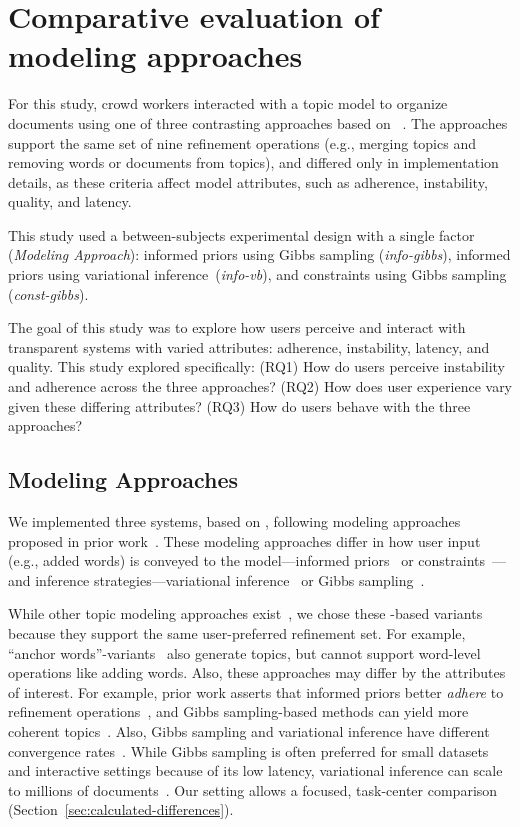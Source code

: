 \section{Comparative evaluation of \hltm{} modeling approaches}

For this study, crowd workers interacted with a topic model to organize documents using one of three contrasting
\hltm{} approaches based on \lda~\cite{blei-03}. The approaches support the same set of nine refinement operations (e.g., merging topics and removing words or documents from topics), and differed only in implementation details, as these criteria affect model attributes, such as adherence, instability, quality, and latency.

This study used a between-subjects experimental design with a single factor (\textit{Modeling Approach}): informed priors using Gibbs sampling
(\textit{info-gibbs}), informed priors using variational inference~(\textit{info-vb}), and constraints using Gibbs sampling
(\textit{const-gibbs}). 

The goal of this study was to explore how users perceive and interact with transparent systems with varied attributes: adherence, instability, latency, and quality. This study explored specifically: 
(RQ1) How do users perceive instability and adherence across the three \hltm{} approaches? 
(RQ2) How does user experience vary given these differing attributes? 
(RQ3) How do users behave with the three \hltm{} approaches?

\subsection{Modeling Approaches}

We implemented three \hltm{} systems, based on \lda{}, following modeling approaches
proposed in prior work~\citep{kumar-19}. These modeling
approaches differ in how user input (e.g., added words) is conveyed to the model---informed priors~\cite{Smith2018ClosingSystem} or constraints~\cite{yang-15}---and inference strategies---variational inference~\cite{blei-03} or Gibbs sampling~\cite{griffiths-04}.

While other topic modeling approaches exist~\cite{Larochelle2012AModel,Hofmann1999ProbabilisticIndexing}, we chose these  \lda-based variants because they support the same user-preferred refinement set. For example, ``anchor words''-variants~\cite{Lund2017TandemModeling} also generate topics, but cannot support word-level operations like adding words. Also, these approaches may differ by the attributes of interest. For example, prior work asserts that informed priors better \textit{adhere} to refinement operations~\cite{kumar-19}, and Gibbs sampling-based methods
can yield more coherent topics~\cite{Nguyen2015ImprovingModeling}.
Also, Gibbs sampling and variational inference have different convergence rates~\cite{asuncion-09b}. While Gibbs sampling is often preferred for small datasets and interactive settings because of its low latency, variational inference can scale to millions of documents~\cite{hoffman-10,Zhai2012MrMapReduce}. 
Our setting allows a focused, task-center comparison (Section~\ref{sec:calculated-differences}).

